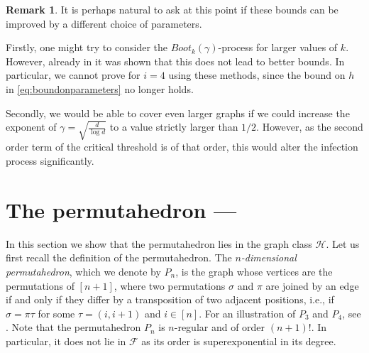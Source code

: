 \documentclass[reqno,a4paper,11pt]{amsart}
\theoremstyle{definition}
\newtheorem{remark}[theorem]{Remark}
\begin{document}
\begin{remark}\label{rem:optimizing}
  It is perhaps natural to ask at this point if these bounds can be improved by a different choice of parameters.

  Firstly, one might try to consider the $Boot_k(\gamma)$-process for larger values of $k$.
  However, already in \cite{BaBoMo2009} it was shown that this does not lead to better bounds.
  In particular, we cannot prove  for $i=4$ using these methods, since the bound on $h$ in \eqref{eq:boundonparameters} no longer holds.

  Secondly, we would be able to cover even larger graphs if we could increase the exponent of $\gamma=\sqrt{\frac{d}{\log d}}$ to a value strictly larger than $1/2$.
  However, as the second order term of the critical threshold is of that order, this would alter the infection process significantly.
\end{remark}


\section{The permutahedron --- }\label{s:permuta}

In this section we show that the permutahedron lies in the graph class $\mathcal{H}$.
Let us first recall the definition of the permutahedron.
The \emph{$n$-dimensional permutahedron}, which we denote by $P_n$, is the graph whose vertices are the permutations of $[n+1]$, where two permutations $\sigma$ and $\pi$ are joined by an edge if and only if they differ by a transposition of two adjacent positions, i.e., if $\sigma = \pi\tau$ for some $\tau = (i, i+1)$ and $i \in [n]$.
For an illustration of $P_3$ and $P_4$, see .
Note that the permutahedron $P_n$ is $n$-regular and of order $(n+1)!$.
In particular, it does not lie in $\mathcal{F}$ as its order is superexponential in its degree.
\end{document}
